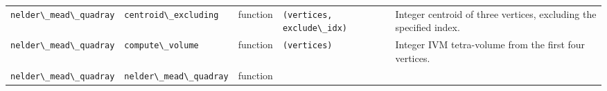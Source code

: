 \documentclass[
  10pt,
]{article}
\newcommand{\passthrough}[1]{#1}
\begin{document}
\begin{longtable}[]{@{}lllll@{}}
\begin{minipage}[t]{0.17\columnwidth}\raggedright
\passthrough{\lstinline!nelder\_mead\_quadray!}\strut
\end{minipage} & \begin{minipage}[t]{0.17\columnwidth}\raggedright
\passthrough{\lstinline!centroid\_excluding!}\strut
\end{minipage} & \begin{minipage}[t]{0.17\columnwidth}\raggedright
function\strut
\end{minipage} & \begin{minipage}[t]{0.17\columnwidth}\raggedright
\passthrough{\lstinline!(vertices, exclude\_idx)!}\strut
\end{minipage} & \begin{minipage}[t]{0.17\columnwidth}\raggedright
Integer centroid of three vertices, excluding the specified index.\strut
\end{minipage}\tabularnewline
\begin{minipage}[t]{0.17\columnwidth}\raggedright
\passthrough{\lstinline!nelder\_mead\_quadray!}\strut
\end{minipage} & \begin{minipage}[t]{0.17\columnwidth}\raggedright
\passthrough{\lstinline!compute\_volume!}\strut
\end{minipage} & \begin{minipage}[t]{0.17\columnwidth}\raggedright
function\strut
\end{minipage} & \begin{minipage}[t]{0.17\columnwidth}\raggedright
\passthrough{\lstinline!(vertices)!}\strut
\end{minipage} & \begin{minipage}[t]{0.17\columnwidth}\raggedright
Integer IVM tetra-volume from the first four vertices.\strut
\end{minipage}\tabularnewline
\begin{minipage}[t]{0.17\columnwidth}\raggedright
\passthrough{\lstinline!nelder\_mead\_quadray!}\strut
\end{minipage} & \begin{minipage}[t]{0.17\columnwidth}\raggedright
\passthrough{\lstinline!nelder\_mead\_quadray!}\strut
\end{minipage} & \begin{minipage}[t]{0.17\columnwidth}\raggedright
function\strut
\end{minipage} & \begin{minipage}[t]{0.17\columnwidth}\raggedright

\end{minipage}
\end{longtable}
\end{document}
